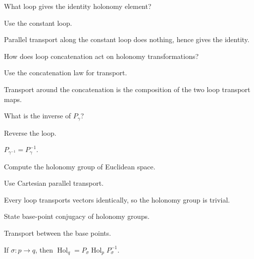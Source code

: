 \begin{exercise}\label{exr:vii25-04}
What loop gives the identity holonomy element?
\end{exercise}
\begin{hint}
Use the constant loop.
\end{hint}
\begin{solution}
Parallel transport along the constant loop does nothing, hence gives the identity.
\end{solution}


\begin{exercise}\label{exr:vii25-05}
How does loop concatenation act on holonomy transformations?
\end{exercise}
\begin{hint}
Use the concatenation law for transport.
\end{hint}
\begin{solution}
Transport around the concatenation is the composition of the two loop transport maps.
\end{solution}


\begin{exercise}\label{exr:vii25-06}
What is the inverse of \(P_\gamma\)?
\end{exercise}
\begin{hint}
Reverse the loop.
\end{hint}
\begin{solution}
\(P_{\gamma^{-1}}=P_\gamma^{-1}\).
\end{solution}


\begin{exercise}\label{exr:vii25-07}
Compute the holonomy group of Euclidean space.
\end{exercise}
\begin{hint}
Use Cartesian parallel transport.
\end{hint}
\begin{solution}
Every loop transports vectors identically, so the holonomy group is trivial.
\end{solution}


\begin{exercise}\label{exr:vii25-08}
State base-point conjugacy of holonomy groups.
\end{exercise}
\begin{hint}
Transport between the base points.
\end{hint}
\begin{solution}
If \(\sigma:p\to q\), then \(\operatorname{Hol}_q=P_\sigma\operatorname{Hol}_pP_\sigma^{-1}\).
\end{solution}


